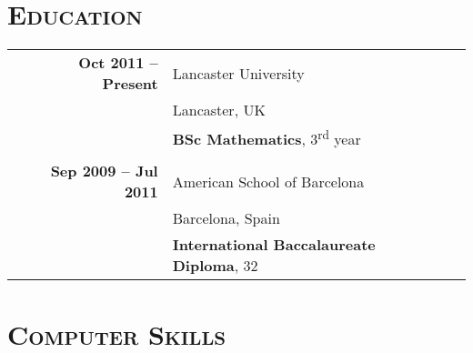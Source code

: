 \documentclass[a4paper,10pt]{article} %
\begin{document}
\section{\textsc{Education}}

\begin{tabularx}{\textwidth}{XrlXr}

&\textbf{Oct 2011 -- Present} & Lancaster University & &\\
&                             & Lancaster, UK & & \\
&                             & \textbf{BSc Mathematics}, 3\textsuperscript{rd} year & &\\
\multicolumn{5}{c}{}\\


&\textbf{Sep 2009 -- Jul 2011} & American School of Barcelona & &\\
&                              & Barcelona, Spain & &\\
&                              & \textbf{International Baccalaureate Diploma}, 32 & &\\




\end{tabularx}


\section{\textsc{Computer Skills}}
\end{document}
